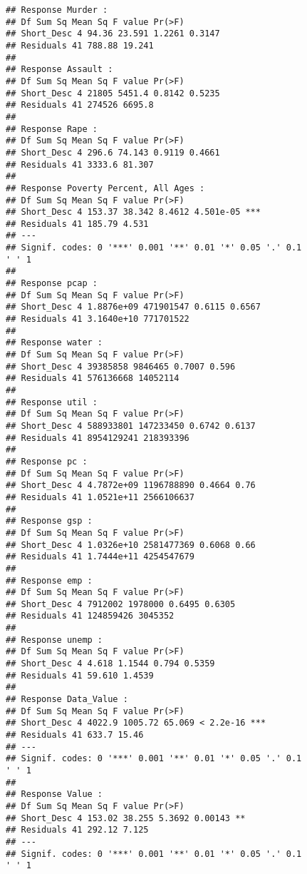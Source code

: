 \documentclass[]{article}
\newenvironment{Shaded}{\begin{snugshade}}{\end{snugshade}}
\newcommand{\DataTypeTok}[1]{\textcolor[rgb]{0.13,0.29,0.53}{#1}}
\newcommand{\KeywordTok}[1]{\textcolor[rgb]{0.13,0.29,0.53}{\textbf{#1}}}
\newcommand{\NormalTok}[1]{#1}
\newcommand{\OperatorTok}[1]{\textcolor[rgb]{0.81,0.36,0.00}{\textbf{#1}}}
\newcommand{\StringTok}[1]{\textcolor[rgb]{0.31,0.60,0.02}{#1}}
\begin{document}
\begin{verbatim}
## Response Murder :
## Df Sum Sq Mean Sq F value Pr(>F)
## Short_Desc 4 94.36 23.591 1.2261 0.3147
## Residuals 41 788.88 19.241
##
## Response Assault :
## Df Sum Sq Mean Sq F value Pr(>F)
## Short_Desc 4 21805 5451.4 0.8142 0.5235
## Residuals 41 274526 6695.8
##
## Response Rape :
## Df Sum Sq Mean Sq F value Pr(>F)
## Short_Desc 4 296.6 74.143 0.9119 0.4661
## Residuals 41 3333.6 81.307
##
## Response Poverty Percent, All Ages :
## Df Sum Sq Mean Sq F value Pr(>F)
## Short_Desc 4 153.37 38.342 8.4612 4.501e-05 ***
## Residuals 41 185.79 4.531
## ---
## Signif. codes: 0 '***' 0.001 '**' 0.01 '*' 0.05 '.' 0.1
' ' 1
##
## Response pcap :
## Df Sum Sq Mean Sq F value Pr(>F)
## Short_Desc 4 1.8876e+09 471901547 0.6115 0.6567
## Residuals 41 3.1640e+10 771701522
##
## Response water :
## Df Sum Sq Mean Sq F value Pr(>F)
## Short_Desc 4 39385858 9846465 0.7007 0.596
## Residuals 41 576136668 14052114
##
## Response util :
## Df Sum Sq Mean Sq F value Pr(>F)
## Short_Desc 4 588933801 147233450 0.6742 0.6137
## Residuals 41 8954129241 218393396
##
## Response pc :
## Df Sum Sq Mean Sq F value Pr(>F)
## Short_Desc 4 4.7872e+09 1196788890 0.4664 0.76
## Residuals 41 1.0521e+11 2566106637
##
## Response gsp :
## Df Sum Sq Mean Sq F value Pr(>F)
## Short_Desc 4 1.0326e+10 2581477369 0.6068 0.66
## Residuals 41 1.7444e+11 4254547679
##
## Response emp :
## Df Sum Sq Mean Sq F value Pr(>F)
## Short_Desc 4 7912002 1978000 0.6495 0.6305
## Residuals 41 124859426 3045352
##
## Response unemp :
## Df Sum Sq Mean Sq F value Pr(>F)
## Short_Desc 4 4.618 1.1544 0.794 0.5359
## Residuals 41 59.610 1.4539
##
## Response Data_Value :
## Df Sum Sq Mean Sq F value Pr(>F)
## Short_Desc 4 4022.9 1005.72 65.069 < 2.2e-16 ***
## Residuals 41 633.7 15.46
## ---
## Signif. codes: 0 '***' 0.001 '**' 0.01 '*' 0.05 '.' 0.1
' ' 1
##
## Response Value :
## Df Sum Sq Mean Sq F value Pr(>F)
## Short_Desc 4 153.02 38.255 5.3692 0.00143 **
## Residuals 41 292.12 7.125
## ---
## Signif. codes: 0 '***' 0.001 '**' 0.01 '*' 0.05 '.' 0.1
' ' 1
\end{verbatim}

\begin{Shaded}
\end{Shaded}
\end{document}
